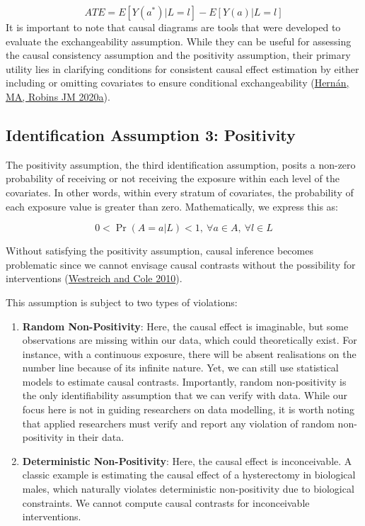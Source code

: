 \documentclass[
  singlecolumn]{report}
\begin{document}
\[
ATE = E[Y(a^*)|L = l] - E[Y(a)|L = l]
\] It is important to note that causal diagrams are tools that were
developed to evaluate the exchangeability assumption. While they can be
useful for assessing the causal consistency assumption and the
positivity assumption, their primary utility lies in clarifying
conditions for consistent causal effect estimation by either including
or omitting covariates to ensure conditional exchangeability
(\protect\hyperlink{ref-hernuxe1nmarobinsjm2020}{Hernán, MA, Robins JM
2020a}).

\hypertarget{identification-assumption-3-positivity}{%
\subsection{Identification Assumption 3:
Positivity}\label{identification-assumption-3-positivity}}

The positivity assumption, the third identification assumption, posits a
non-zero probability of receiving or not receiving the exposure within
each level of the covariates. In other words, within every stratum of
covariates, the probability of each exposure value is greater than zero.
Mathematically, we express this as:

\[
0 < \Pr(A=a|L)<1, ~ \forall a \in A, ~ \forall l \in L
\]

Without satisfying the positivity assumption, causal inference becomes
problematic since we cannot envisage causal contrasts without the
possibility for interventions
(\protect\hyperlink{ref-westreich2010}{Westreich and Cole 2010}).

This assumption is subject to two types of violations:

\begin{enumerate}
\def\labelenumi{\arabic{enumi}.}
\item
  \textbf{Random Non-Positivity}: Here, the causal effect is imaginable,
  but some observations are missing within our data, which could
  theoretically exist. For instance, with a continuous exposure, there
  will be absent realisations on the number line because of its infinite
  nature. Yet, we can still use statistical models to estimate causal
  contrasts. Importantly, random non-positivity is the only
  identifiability assumption that we can verify with data. While our
  focus here is not in guiding researchers on data modelling, it is
  worth noting that applied researchers must verify and report any
  violation of random non-positivity in their data.
\item
  \textbf{Deterministic Non-Positivity}: Here, the causal effect is
  inconceivable. A classic example is estimating the causal effect of a
  hysterectomy in biological males, which naturally violates
  deterministic non-positivity due to biological constraints. We cannot
  compute causal contrasts for inconceivable interventions.
\end{enumerate}
\end{document}
